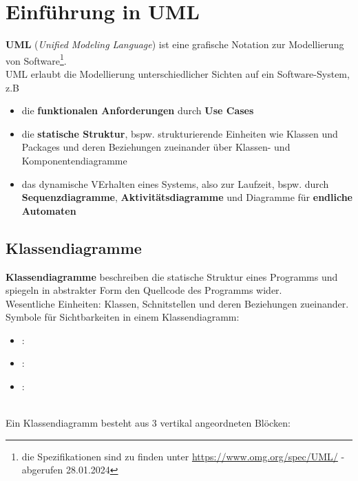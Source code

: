 \section{Einführung in UML}

\textbf{UML} (\textit{Unified Modeling Language}) ist eine grafische Notation zur Modellierung von Software\footnote{
die Spezifikationen sind zu finden unter \url{https://www.omg.org/spec/UML/} - abgerufen 28.01.2024
}.\\

\noindent
UML erlaubt die Modellierung unterschiedlicher Sichten auf ein Software-System, z.B

\begin{itemize}
    \item die \textbf{funktionalen Anforderungen} durch \textbf{Use Cases}
    \item die \textbf{statische Struktur}, {bspw.} strukturierende Einheiten wie Klassen und Packages und deren Beziehungen zueinander über Klassen- und Komponentendiagramme
    \item das dynamische VErhalten eines Systems, also zur Laufzeit, {bspw.} durch \textbf{Sequenzdiagramme}, \textbf{Aktivitätsdiagramme} und Diagramme für \textbf{endliche Automaten}
\end{itemize}
\noindent

\subsection{Klassendiagramme}

\textbf{Klassendiagramme} beschreiben die statische Struktur eines Programms und spiegeln in abstrakter Form den Quellcode des Programms wider.\\

\noindent
Wesentliche Einheiten: Klassen, Schnitstellen und deren Beziehungen zueinander.\\

\noindent
Symbole für Sichtbarkeiten in einem Klassendiagramm:

\begin{itemize}
    \item {}: \code{+}
    \item {}: \code{-}
    \item {}: \code{#}
\end{itemize}\\

\noindent
Ein Klassendiagramm besteht aus 3 vertikal angeordneten Blöcken:\\

